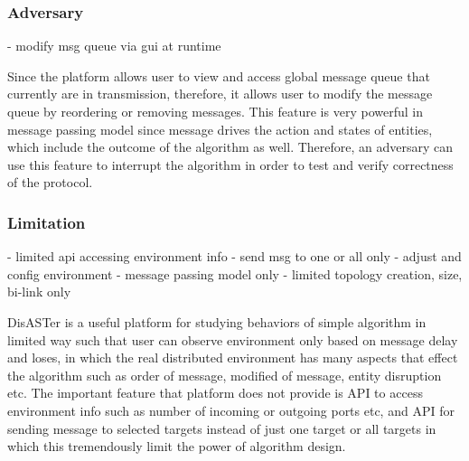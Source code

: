 \subsubsection{Adversary}
- modify msg queue via gui at runtime

Since the platform allows user to view and access global message queue that currently are in transmission, therefore, it allows user to modify the message queue by reordering or removing messages. This feature is very powerful in message passing model since message drives the action and states of entities, which include the outcome of the algorithm as well. Therefore, an adversary can use this feature to interrupt the algorithm in order to test and verify correctness of the protocol.

\subsubsection{Limitation}
- limited api accessing environment info
- send msg to one or all only
- adjust and config environment
- message passing model only
- limited topology creation, size, bi-link only

DisASTer is a useful platform for studying behaviors of simple algorithm in limited way such that user can observe environment only based on message delay and loses, in which the real distributed environment has many aspects that effect the algorithm such as order of message, modified of message, entity disruption etc. The important feature that platform does not provide is API to access environment info such as number of incoming or outgoing ports etc, and API for sending message to selected targets instead of just one target or all targets in which this tremendously limit the power of algorithm design.


